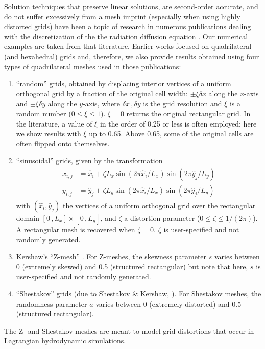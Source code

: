 \documentclass[preprint,10pt]{elsarticle}
\begin{document}
Solution techniques that preserve linear solutions, are 
second-order accurate, and do not suffer excessively from a mesh imprint (especially when using highly
distorted grids) have been a topic of research in numerous publications dealing with the discretization of the
the radiation diffusion equation . Our numerical examples
are taken from that literature. Earlier works focused on quadrilateral (and hexahedral) grids
\cite{Morel1992,MorelRobertsShashkov1998,MorelHallShashkov2001,Palmer2001} and, therefore, 
we also provide results obtained using four types of quadrilateral meshes used in those publications: 
\begin{enumerate}
\item 
``random'' grids, obtained by displacing interior vertices of a uniform orthogonal grid by a fraction
of the original cell width: $\pm\xi\delta x$ along 
the $x$-axis and $\pm\xi\delta y$ along the $y$-axis, where $\delta x\,,\delta y$ is the grid resolution 
and $\xi$ is a random number ($0 \le \xi \le 1$). $\xi=0$ returns the original rectangular grid. In 
the literature, a value of $\xi$ in the order of 0.25 or less is often employed; here we show results with $\xi$ up to 0.65. 
Above 0.65, some of the original cells are often flipped onto themselves. 
\item
 ``sinusoidal'' grids, given by the transformation
\begin{align*}
x_{i,j} &= \hat x_i + \zeta L_x \sin\left(2\pi \hat x_i/L_x \right) \sin\left(2\pi \hat y_j/L_y \right) \\
y_{i,j} &= \hat y_j + \zeta L_y \sin\left(2\pi \hat x_i/L_x \right) \sin\left(2\pi \hat y_j/L_y \right) 
\end{align*}
with $(\hat x_i, \hat y_j)$ the vertices of a uniform orthogonal grid over the rectangular domain 
$[0\, , L_x]\times [0\, , L_y]$, and $\zeta$ a distortion parameter ($0\le \zeta \le 1/(2\pi)$). 
A rectangular mesh is recovered when $\zeta=0$. $\zeta$ is user-specified and not randomly generated.
\item
Kershaw's ``Z-mesh'' \cite{Kershaw1981}.  
For Z-meshes, the skewness parameter $s$ varies between 0 (extremely skewed) and 0.5 (structured rectangular)
but note that here, $s$ is user-specified and not randomly generated.
\item 
``Shestakov'' grids (due to Shestakov \& Kershaw, \cite{Shestakov1988,Sheshakov1990}).
For Shestakov meshes, the randomness parameter $a$ varies between 0 (extremely distorted) 
and 0.5 (structured rectangular).
\end{enumerate}
The Z- and Shestakov meshes are meant to model grid distortions that occur in Lagrangian hydrodynamic 
simulations. 
\end{document}
